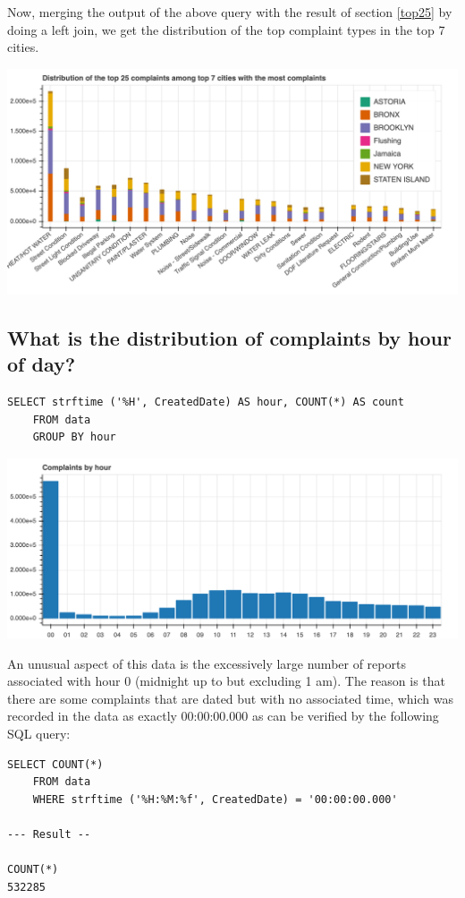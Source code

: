 \documentclass[12pt,a4paper]{article}
\begin{document}
Now, merging the output of the above query with the result of section \ref{top25} by doing a left join, we get the distribution of the top complaint types in the top 7 cities.

\includegraphics[scale=0.3]{topcomplaintsfortop7cities}

\subsection{What is the distribution of complaints by hour of day?}
\begin{verbatim}
SELECT strftime ('%H', CreatedDate) AS hour, COUNT(*) AS count
    FROM data
    GROUP BY hour
\end{verbatim}

\includegraphics[scale=0.3]{complaintsbyhour}


An unusual aspect of this data is the excessively large number of reports associated with hour 0 (midnight up to but excluding 1 am). The reason is that there are some complaints that are dated but with no associated time, which was recorded in the data as exactly 00:00:00.000 as can be verified by the following SQL query:

\begin{verbatim}
SELECT COUNT(*)
    FROM data
    WHERE strftime ('%H:%M:%f', CreatedDate) = '00:00:00.000'

--- Result --

COUNT(*)
532285
\end{verbatim}
\end{document}
